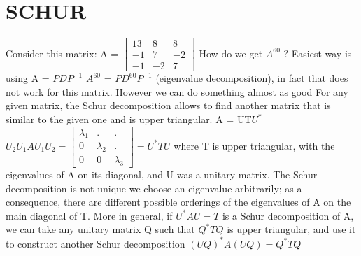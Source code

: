 \documentclass[]{finalproject}
\begin{document}
\section{SCHUR} \label{schur}
\begin{flushleft}
Consider this matrix: \newline \newline
A = $\begin{bmatrix} 
13 & 8 & 8 \\
-1 & 7 & -2 \\
-1 & -2 & 7
\end{bmatrix} $  How do we get $ A^{60} $ ? \newline
Easiest way is using A = $P D P^{-1} $ \qquad $ A^{60}$ = $P D^{60} P^{-1}$ (eigenvalue decomposition), in fact that does not work for this matrix. However we can do something almost as good
For any given matrix, the Schur decomposition allows to find another matrix that is similar to the given one and is upper triangular. \newline
A = UT$U^{*}$ \qquad $ U_{2}U_{1}AU_{1}U_{2} = \begin{bmatrix} 
\lambda_{1} & . & .\\
0 & \lambda_{2} & .\\
0 & 0 & \lambda_{3}
\end{bmatrix} = U^{*}TU$ \newline
where T is upper triangular, with the eigenvalues of A on its diagonal, and U was a unitary matrix. \newline
The Schur decomposition is not unique
we choose an eigenvalue arbitrarily; as a consequence, there are different possible orderings of the eigenvalues of A on the main diagonal of T. \newline
More in general, if \qquad $ U^{*}AU = T $ \newline
is a Schur decomposition of A, we can take any unitary matrix Q such that $ Q^{*}TQ $ \newline
is upper triangular, and use it to construct another Schur decomposition $ (UQ)^{*}A(UQ) = Q^{*}TQ $ \cite{schur} \newline
 

\end{flushleft}
\end{document}
